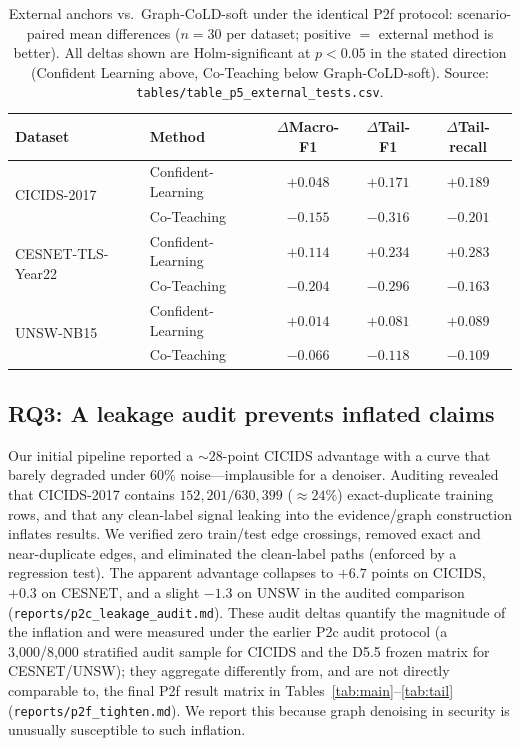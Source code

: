 \documentclass[preprint,3p,times]{elsarticle}
\begin{document}
\begin{table}[t]
\centering
\caption{External anchors vs.\ Graph-CoLD-soft under the identical P2f protocol:
scenario-paired mean differences ($n=30$ per dataset; positive $=$ external
method is better). All deltas shown are Holm-significant at $p<0.05$ in the
stated direction (Confident Learning above, Co-Teaching below Graph-CoLD-soft).
Source: \texttt{tables/table\_p5\_external\_tests.csv}.}
\label{tab:external}
\small
\begin{tabular}{llccc}
\toprule
Dataset & Method & $\Delta$Macro-F1 & $\Delta$Tail-F1 & $\Delta$Tail-recall \\
\midrule
\multirow{2}{*}{CICIDS-2017}
 & Confident-Learning & $+0.048$ & $+0.171$ & $+0.189$ \\
 & Co-Teaching & $-0.155$ & $-0.316$ & $-0.201$ \\
\midrule
\multirow{2}{*}{CESNET-TLS-Year22}
 & Confident-Learning & $+0.114$ & $+0.234$ & $+0.283$ \\
 & Co-Teaching & $-0.204$ & $-0.296$ & $-0.163$ \\
\midrule
\multirow{2}{*}{UNSW-NB15}
 & Confident-Learning & $+0.014$ & $+0.081$ & $+0.089$ \\
 & Co-Teaching & $-0.066$ & $-0.118$ & $-0.109$ \\
\bottomrule
\end{tabular}
\end{table}

\subsection{RQ3: A leakage audit prevents inflated claims}
\label{sec:res-leak}
Our initial pipeline reported a $\sim\!28$-point CICIDS advantage with a curve that
barely degraded under $60\%$ noise—implausible for a denoiser. Auditing revealed
that CICIDS-2017 contains $152{,}201/630{,}399$ ($\approx24\%$) exact-duplicate
training rows, and that any clean-label signal leaking into the evidence/graph
construction inflates results. We verified zero train/test edge crossings, removed
exact and near-duplicate edges, and eliminated the clean-label paths (enforced by a
regression test). The apparent advantage collapses to $+6.7$ points on CICIDS,
$+0.3$ on CESNET, and a slight $-1.3$ on UNSW in the audited comparison
(\texttt{reports/p2c\_leakage\_audit.md}). These audit deltas quantify the
magnitude of the inflation and were measured under the earlier P2c audit protocol
(a 3,000/8,000 stratified audit sample for CICIDS and the D5.5 frozen matrix for
CESNET/UNSW); they aggregate differently from, and are not directly comparable to,
the final P2f result matrix in Tables~\ref{tab:main}--\ref{tab:tail}
(\texttt{reports/p2f\_tighten.md}). We report this because graph denoising
in security is unusually susceptible to such inflation.
\end{document}
